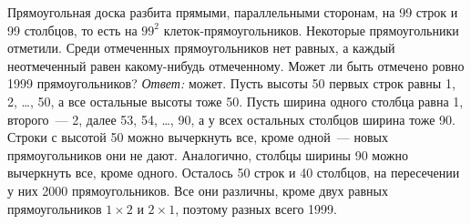 \problem
Прямоугольная доска разбита прямыми, параллельными сторонам, на 99 строк и 99
столбцов, то есть на $99^2$ клеток-прямо\-у\-голь\-ников.
Некоторые прямоугольники отметили.
Среди отмеченных прямоугольников нет равных, а каждый неотмеченный равен
какому-нибудь отмеченному.
Может ли быть отмечено ровно 1999 прямоугольников?
\solution
\emph{Ответ:} может.
Пусть высоты 50 первых строк равны 1, 2, \ldots, 50, а все остальные высоты
тоже 50.
Пусть ширина одного столбца равна 1, второго~--- 2, далее 53, 54, \ldots, 90, а
у всех остальных столбцов ширина тоже 90.
Строки с высотой 50 можно вычеркнуть все, кроме одной~--- новых прямоугольников
они не дают.
Аналогично, столбцы ширины 90 можно вычеркнуть все, кроме одного.
Осталось 50 строк и 40 столбцов, на пересечении у них 2000 прямоугольников.
Все они различны, кроме двух равных прямоугольников $1 \times 2$ и
$2 \times 1$, поэтому разных всего 1999.
\endproblem 
